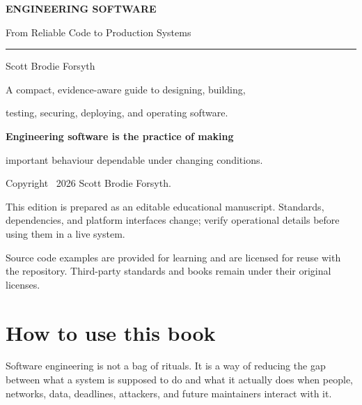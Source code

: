 \documentclass[11pt,openright]{book}
\makeatletter
\renewcommand{\cleardoublepage}{%
  \clearpage
  \if@twoside
    \ifodd\c@page
    \else
      \hbox{}\thispagestyle{empty}\newpage
      \if@twocolumn\hbox{}\newpage\fi
    \fi
  \fi
}
\makeatother
\begin{document}
\frontmatter
\begin{titlepage}
  \pagecolor{ink}
  \color{white}
  \vspace*{1.15in}
  {\sffamily\fontsize{24}{28}\selectfont\bfseries ENGINEERING SOFTWARE\par}
  \vspace{0.22in}
  {\sffamily\Large From Reliable Code to Production Systems\par}
  \vspace{0.36in}
  \textcolor{white!55}{\rule{1.2in}{0.8pt}}\par
  \vfill
  {\sffamily\large Scott Brodie Forsyth\par}
  \vspace{0.25in}
  {\sffamily\small A compact, evidence-aware guide to designing, building,\par\noindent\hspace*{0pt}testing, securing, deploying, and operating software.\par}
  \thispagestyle{empty}
\end{titlepage}
\nopagecolor

\cleardoublepage
\thispagestyle{empty}
\vspace*{1.2in}
\begin{center}
  {\Large\sffamily\bfseries Engineering software is the practice of making\par}
  \vspace{0.15in}
  {\large\sffamily\color{muted}important behaviour dependable under changing conditions.\par}
\end{center}
\vfill
\noindent\small
Copyright \textcopyright\ 2026 Scott Brodie Forsyth.\par
\vspace{0.1in}
This edition is prepared as an editable educational manuscript. Standards,
dependencies, and platform interfaces change; verify operational details before
using them in a live system.\par
\vspace{0.1in}
Source code examples are provided for learning and are licensed for reuse with
the repository. Third-party standards and books remain under their original
licenses.

\cleardoublepage
\tableofcontents

\chapter*{How to use this book}
Software engineering is not a bag of rituals. It is a way of reducing the gap
between what a system is supposed to do and what it actually does when people,
networks, data, deadlines, attackers, and future maintainers interact with it.
\end{document}
